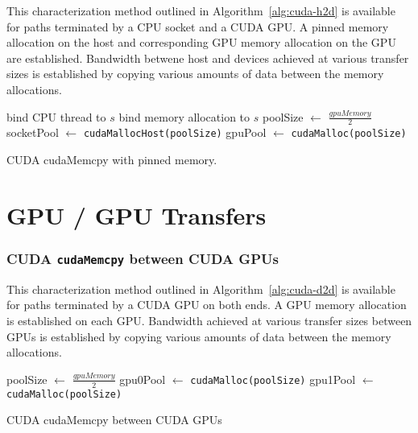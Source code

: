 This characterization method outlined in Algorithm~\ref{alg:cuda-h2d} is available for paths terminated by a CPU socket and a CUDA GPU.
A pinned memory allocation on the host and corresponding GPU memory allocation on the GPU are established.
Bandwidth betwene host and devices achieved at various transfer sizes is established by copying various amounts of data between the memory allocations.


\begin{algorithm}[ht]
    \SetAlgoLined
    bind CPU thread to $s$\;
    bind memory allocation to $s$\;
    poolSize $\gets$ $\frac{gpuMemory}{2}$\;
    socketPool $\gets$ \texttt{cudaMallocHost(poolSize)}\;
    gpuPool $\gets$ \texttt{cudaMalloc(poolSize)}\;
    \caption{CUDA cudaMemcpy with pinned memory.}
    \label{alg:cuda-h2d}
\end{algorithm}

\section{GPU / GPU Transfers}


\subsubsection{CUDA \texttt{cudaMemcpy} between CUDA GPUs}

This characterization method outlined in Algorithm~\ref{alg:cuda-d2d} is available for paths terminated by a CUDA GPU on both ends.
A GPU memory allocation is established on each GPU.
Bandwidth achieved at various transfer sizes between GPUs is established by copying various amounts of data between the memory allocations.

\begin{algorithm}[ht]
    \SetAlgoLined
    poolSize $\gets$ $\frac{gpuMemory}{2}$\;
    gpu0Pool $\gets$ \texttt{cudaMalloc(poolSize)}\;
    gpu1Pool $\gets$ \texttt{cudaMalloc(poolSize)}\;
    \caption{CUDA cudaMemcpy between CUDA GPUs}
    \label{alg:cuda-d2d}
\end{algorithm}

